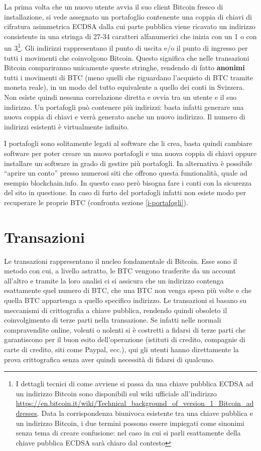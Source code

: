 La prima volta che un nuovo utente avvia il suo client Bitcoin fresco di installazione, si vede assegnato un portafoglio contenente una coppia di chiavi di cifratura asimmetrica ECDSA dalla cui parte pubblica viene ricavato un indirizzo consistente in una stringa di 27-34 caratteri alfanumerici che inizia con un 1 o con un 3\footnote{I dettagli tecnici di come avviene si passa da una chiave pubblica ECDSA ad un indirizzo Bitcoin sono disponibili sul wiki ufficiale all'indirizzo \url{https://en.bitcoin.it/wiki/Technical_background_of_version_1_Bitcoin_addresses}. Data la corrispondenza biunivoca esistente tra una chiave pubblica e un indirizzo Bitcoin, i due termini possono essere impiegati come sinonimi senza tema di creare confusione: nel caso in cui si parli esattamente della chiave pubblica ECDSA sarà chiaro dal contesto}. Gli indirizzi rappresentano il punto di uscita e/o il punto di ingresso per tutti i movimenti che coinvolgono Bitcoin. Questo significa che nelle transazioni Bitcoin compariranno unicamente queste stringhe, rendendo di fatto \textbf{anonimi} tutti i movimenti di BTC (meno quelli che riguardano l'acquisto di BTC tramite moneta reale), in un modo del tutto equivalente a quello dei conti in Svizzera. Non esiste quindi nessuna correlazione diretta e ovvia tra un utente e il suo indirizzo. Un portafogli può contenere più indirizzi: basta infatti generare una nuova coppia di chiavi e verrà generato anche un nuovo indirizzo. Il numero di indirizzi esistenti è virtualmente infinito.

I portafogli sono solitamente legati al software che li crea, basta quindi cambiare software per poter creare un nuovo portafogli e una nuova coppia di chiavi oppure installare un software in grado di gestire più portafogli. In alternativa è possibile ``aprire un conto'' presso numerosi siti che offrono questa funzionalità, quale ad esempio blockchain.info. In questo caso però bisogna fare i conti con la sicurezza del sito in questione. In caso di furto del portafogli infatti non esiste modo per recuperare le proprie BTC (confronta sezione \ref{i-portafogli}).

\section{Transazioni}\label{transazioni}

Le transazioni rappresentano il nucleo fondamentale di Bitcoin. Esse sono il metodo con cui, a livello astratto, le BTC vengono trasferite da un account all'altro e tramite la loro analisi ci si assicura che un indirizzo contenga esattamente quel numero di BTC, che una BTC non venga spesa più volte e che quella BTC appartenga a quello specifico indirizzo. Le transazioni si basano su meccanismi di crittografia a chiave pubblica, rendendo quindi obsoleto il coinvolgimento di terze parti nella transazione. Se infatti nelle normali compravendite online, volenti o nolenti si è costretti a fidarsi di terze parti che garantiscono per il buon esito dell'operazione (istituti di credito, compagnie di carte di credito, siti come Paypal, ecc.), qui gli utenti hanno direttamente la prova crittografica senza aver quindi necessità di fidarsi di qualcuno.

